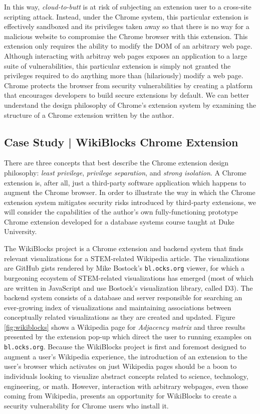 \documentclass[a4paper, 11pt]{article} %
\begin{document}
In this way, \textit{cloud-to-butt} is at risk of subjecting an extension user to a cross-site scripting attack. Instead, under the Chrome system, this particular extension is effectively sandboxed and its privileges taken away so that there is no way for a malicious website to compromise the Chrome browser with this extension. This extension only requires the ability to modify the DOM of an arbitrary web page. Although interacting with arbitray web pages exposes an application to a large suite of vulnerabilities, this particular extension is simply not granted the privileges required to do anything more than (hilariously) modify a web page. Chrome protects the browser from security vulnerabilities by creating a platform that encourages developers to build secure extensions by default. We can better understand the design philosophy of Chrome's extension system by examining the structure of a Chrome extension written by the author.

\subsection{Case Study | WikiBlocks Chrome Extension}

There are three concepts that best describe the Chrome extension design philosophy: \textit{least privilege}, \textit{privilege separation}, and \textit{strong isolation}. \cite{38394} A Chrome extension is, after all, just a third-party software application which happens to augment the Chrome browser. In order to illustrate the way in which the Chrome extension system mitigates security risks introduced by third-party extensions, we will consider the capabilities of the author's own fully-functioning prototype Chrome extension developed for a database systems course taught at Duke University.

The WikiBlocks project is a Chrome extension and backend system that finds relevant visualizations for a STEM-related Wikipedia article. The visualizations are GitHub gists rendered by Mike Bostock's \texttt{bl.ocks.org} viewer, for which a burgeoning ecoystem of STEM-related visualizations has emerged (most of which are written in JavaScript and use Bostock's visualization library, called D3). The backend system consists of a database and server responsible for searching an ever-growing index of visualizations and maintaining associations between conceptually related visualizations as they are created and updated. Figure \ref{fig:wikiblocks} shows a Wikipedia page for \textit{Adjacency matrix} and three results presented by the extension pop-up which direct the user to running examples on \texttt{bl.ocks.org}. Because the WikiBlocks project is first and foremost designed to augment a user's Wikipedia experience, the introduction of an extension to the user's browser which activates on just Wikipedia pages should be a boon to individuals looking to visualize abstract concepts related to science, technology, engineering, or math. However, interaction with arbitrary webpages, even those coming from Wikipedia, presents an opportunity for WikiBlocks to create a security vulnerability for Chrome users who install it.
\end{document}
